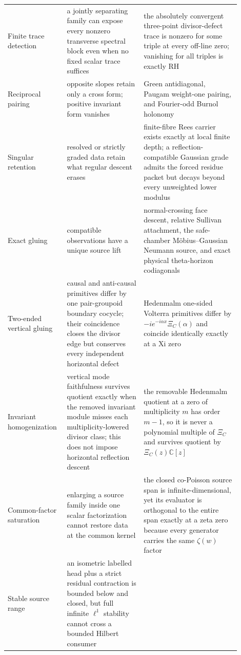 \documentclass[11pt]{article}
\theoremstyle{definition}
\theoremstyle{remark}
\newcommand{\C}{\mathbb C}
\begin{document}
\begin{longtable}{@{}>{\raggedright\arraybackslash}p{0.20\linewidth}
                >{\raggedright\arraybackslash}p{0.31\linewidth}
                >{\raggedright\arraybackslash}p{0.39\linewidth}@{}}
Finite trace detection
 & a jointly separating family can expose every nonzero transverse spectral block even when no fixed scalar trace suffices
 & the absolutely convergent three-point divisor-defect trace is nonzero for some triple at every off-line zero; vanishing for all triples is exactly RH\\\addlinespace[2pt]
Reciprocal pairing
 & opposite slopes retain only a cross form; positive invariant form vanishes
 & Green antidiagonal, Paugam weight-one pairing, and Fourier-odd Burnol holonomy\\\addlinespace[2pt]
Singular retention
 & resolved or strictly graded data retain what regular descent erases
 & finite-fibre Rees carrier exists exactly at local finite depth; a reflection-compatible Gaussian grade admits the forced residue packet but decays beyond every unweighted lower modulus\\\addlinespace[2pt]
Exact gluing
 & compatible observations have a unique source lift
 & normal-crossing face descent, relative Sullivan attachment, the safe-chamber M\"obius--Gaussian Neumann source, and exact physical theta-horizon codiagonals\\\addlinespace[2pt]
Two-ended vertical gluing
 & causal and anti-causal primitives differ by one pair-groupoid boundary cocycle; their coincidence closes the divisor edge but conserves every independent horizontal defect
 & Hedenmalm one-sided Volterra primitives differ by \(-i e^{-i\alpha x}\Xi_C(\alpha)\) and coincide identically exactly at a Xi zero\\\addlinespace[2pt]
Invariant homogenization
 & vertical mode faithfulness survives quotient exactly when the removed invariant module misses each multiplicity-lowered divisor class; this does not impose horizontal reflection descent
 & the removable Hedenmalm quotient at a zero of multiplicity \(m\) has order \(m-1\), so it is never a polynomial multiple of \(\Xi_C\) and survives quotient by \(\Xi_C(z)\C[z]\)\\\addlinespace[2pt]
Common-factor saturation
 & enlarging a source family inside one scalar factorization cannot restore data at the common kernel
 & the closed co-Poisson source span is infinite-dimensional, yet its evaluator is orthogonal to the entire span exactly at a zeta zero because every generator carries the same \(\zeta(w)\) factor\\\addlinespace[2pt]
Stable source range
 & an isometric labelled head plus a strict residual contraction is bounded below and closed, but full infinite \(\ell^1\) stability cannot cross a bounded Hilbert consumer

\end{longtable}
\end{document}
